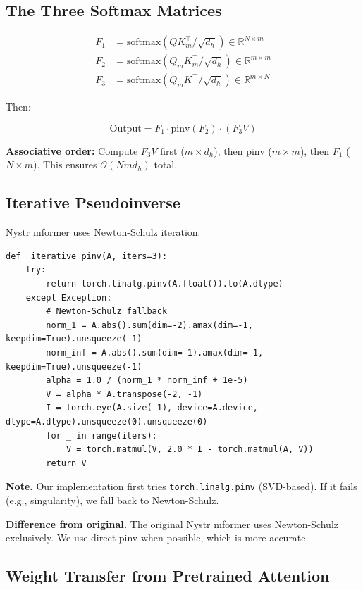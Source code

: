 \subsection{The Three Softmax Matrices}

\[
\begin{aligned}
F_1 &= \text{softmax}(Q K_m^\top / \sqrt{d_h}) \in \mathbb{R}^{N \times m} \\
F_2 &= \text{softmax}(Q_m K_m^\top / \sqrt{d_h}) \in \mathbb{R}^{m \times m} \\
F_3 &= \text{softmax}(Q_m K^\top / \sqrt{d_h}) \in \mathbb{R}^{m \times N}
\end{aligned}
\tag{4.2}
\]

Then:

\[
\text{Output} = F_1 \cdot \text{pinv}(F_2) \cdot (F_3 V)
\tag{4.3}
\]

\textbf{Associative order:} Compute $F_3 V$ first ($m \times d_h$), then pinv 
($m \times m$), then $F_1$ ($N \times m$). This ensures $\mathcal{O}(N m d_h)$ 
total.

\subsection{Iterative Pseudoinverse}

Nystr mformer uses Newton-Schulz iteration:

\begin{lstlisting}
def _iterative_pinv(A, iters=3):
    try:
        return torch.linalg.pinv(A.float()).to(A.dtype)
    except Exception:
        # Newton-Schulz fallback
        norm_1 = A.abs().sum(dim=-2).amax(dim=-1, keepdim=True).unsqueeze(-1)
        norm_inf = A.abs().sum(dim=-1).amax(dim=-1, keepdim=True).unsqueeze(-1)
        alpha = 1.0 / (norm_1 * norm_inf + 1e-5)
        V = alpha * A.transpose(-2, -1)
        I = torch.eye(A.size(-1), device=A.device, dtype=A.dtype).unsqueeze(0).unsqueeze(0)
        for _ in range(iters):
            V = torch.matmul(V, 2.0 * I - torch.matmul(A, V))
        return V
\end{lstlisting}

\textbf{Note.} Our implementation first tries \texttt{torch.linalg.pinv} (SVD-based). 
If it fails (e.g., singularity), we fall back to Newton-Schulz.

\textbf{Difference from original.} The original Nystr mformer uses Newton-Schulz 
exclusively. We use direct pinv when possible, which is more accurate.

\subsection{Weight Transfer from Pretrained Attention}

